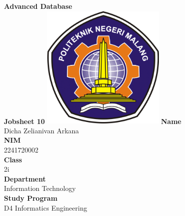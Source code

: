\documentclass[12pt,titlepage]{article}
\newcommand{\vSubject}{Advanced Database}
\newcommand{\vSubtitle}{Jobsheet 10}
\newcommand{\vName}{Dicha Zelianivan Arkana}
\newcommand{\vNIM}{2241720002}
\newcommand{\vClass}{2i}
\newcommand{\vDepartment}{Information Technology}
\newcommand{\vStudyProgram}{D4 Informatics Engineering}
\begin{document}
\begin{titlepage}
    \centering
    \vfill
    {\bfseries\LARGE
        \vSubject\\
        \vskip0.25cm
        \vSubtitle
    }
    \vfill
    \includegraphics[width=6cm]{images/polinema-logo.png}
    \vfill
    {
        \textbf{Name}\\
        \vName\\
        \vskip0.5cm
        \textbf{NIM}\\
        \vNIM\\
        \vskip0.5cm
        \textbf{Class}\\
        \vClass\\
        \vskip0.5cm
        \textbf{Department}\\
        \vDepartment\\
        \vskip0.5cm
        \textbf{Study Program}\\
        \vStudyProgram
    }
\end{titlepage}
\end{document}
